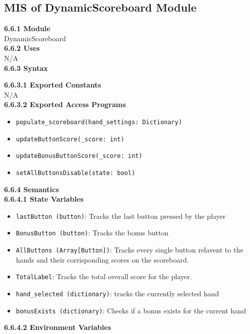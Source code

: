 \documentclass[12pt, titlepage]{article}
\begin{document}
\subsection{MIS of DynamicScoreboard Module}
\textbf{6.6.1 Module}\\
 DynamicScoreboard\\

\noindent \textbf{6.6.2 Uses}\\

N/A \\

\noindent \textbf{6.6.3 Syntax}

\noindent \textbf{6.6.3.1 Exported Constants}\\

\noindent N/A\\

\textbf{6.6.3.2 Exported Access Programs}
\begin{itemize}
	\item \texttt{populate\_scoreboard(hand\_settings: Dictionary)}
	\item \texttt{updateButtonScore(\_score: int)}
	\item \texttt{updateBonusButtonScore(\_score: int)}
	\item \texttt{setAllButtonsDisable(state: bool)}
	
	
\end{itemize}

\noindent \textbf{6.6.4 Semantics}\\
\textbf{6.6.4.1 State Variables}\\
\begin{itemize}
	\item \texttt{lastButton (button)}: Tracks the last button pressed by the player
	\item \texttt{BonusButton (button)}: Tracks the bonus button 
	\item \texttt{AllButtons (Array[Button])}: Tracks every single button relavent to the hands and their corrisponding scores on the scoreboard.
	\item \texttt{TotalLabel}: Tracks the total overall score for the player.
	\item \texttt{hand\_selected (dictionary)}: tracks the currently selected hand
	\item \texttt{bonusExists (dictionary)}: Checks if a bonus exists for the current hand

\end{itemize}

\textbf{6.6.4.2 Environment Variables}
\end{document}
